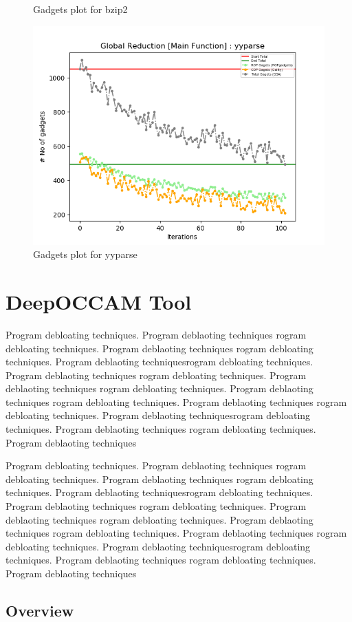 \documentclass{relatorio}
\begin{document}
\begin{figure}[H]
	\caption{Gadgets plot for \color{blue} bzip2}%
	\label{fig:plant}
	\centering
	\captionsetup{justification=centering}
	\includegraphics[width=0.65\linewidth]{imgs/chisel_gadgets_yyparse_plot.png}
	\caption{Gadgets plot for \color{blue} yyparse}%
	\label{fig:plant}
\end{figure}

\section{DeepOCCAM Tool}%
\label{Tools}

Program debloating techniques. Program deblaoting techniques rogram debloating techniques. Program deblaoting techniques
rogram debloating techniques. Program deblaoting techniquesrogram debloating techniques. Program deblaoting techniques
rogram debloating techniques. Program deblaoting techniques rogram debloating techniques. Program deblaoting techniques
rogram debloating techniques. Program deblaoting techniques 
rogram debloating techniques. Program deblaoting techniquesrogram debloating techniques. Program deblaoting techniques
rogram debloating techniques. Program deblaoting techniques

Program debloating techniques. Program deblaoting techniques rogram debloating techniques. Program deblaoting techniques
rogram debloating techniques. Program deblaoting techniquesrogram debloating techniques. Program deblaoting techniques
rogram debloating techniques. Program deblaoting techniques rogram debloating techniques. Program deblaoting techniques
rogram debloating techniques. Program deblaoting techniques 
rogram debloating techniques. Program deblaoting techniquesrogram debloating techniques. Program deblaoting techniques
rogram debloating techniques. Program deblaoting techniques	

\subsection{Overview}%
\label{Tools}
\end{document}
